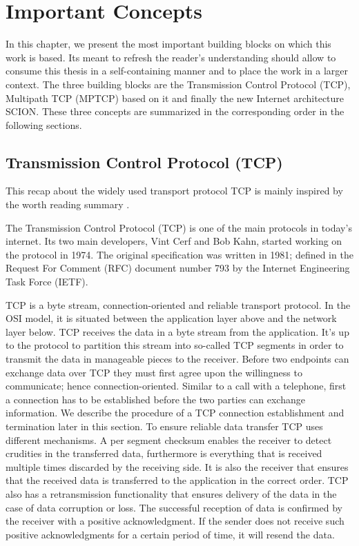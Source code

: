 
\chapter{Important Concepts}
\label{chap:Concepts}
In this chapter, we present the most important building blocks on which this work is based. Its meant to refresh the reader's understanding should allow to consume this thesis in a self-containing manner and to place the work in a larger context. The three building blocks are the Transmission Control Protocol (TCP), Multipath TCP (MPTCP) based on it and finally the new Internet architecture SCION. These three concepts are summarized in the corresponding order in the following sections.

\section{Transmission Control Protocol (TCP)}
\label{sec:TCP}

This recap about the widely used transport protocol TCP is mainly inspired by the worth reading summary \cite{TCPSummary}.

The Transmission Control Protocol (TCP) is one of the main protocols in today's internet. Its two main developers, Vint Cerf and Bob Kahn, started working on the protocol in 1974. The original specification was written in 1981; defined in the Request For Comment (RFC) document number 793 \cite{rfc793} by the Internet Engineering Task Force (IETF).

TCP is a byte stream, connection-oriented and reliable transport protocol. In the OSI model, it is situated between the application layer above and the network layer below. TCP receives the data in a byte stream from the application. It's up to the protocol to partition this stream into so-called TCP segments in order to transmit the data in manageable pieces to the receiver. Before two endpoints can exchange data over TCP they must first agree upon the willingness to communicate; hence connection-oriented. Similar to a call with a telephone, first a connection has to be established before the two parties can exchange information. We describe the procedure of a TCP connection establishment and termination later in this section. To ensure reliable data transfer TCP uses different mechanisms. A per segment checksum enables the receiver to detect crudities in the transferred data, furthermore is everything that is received multiple times discarded by the receiving side. It is also the receiver that ensures that the received data is transferred to the application in the correct order. TCP also has a retransmission functionality that ensures delivery of the data in the case of data corruption or loss. The successful reception of data is confirmed by the receiver with a positive acknowledgment. If the sender does not receive such positive acknowledgments for a certain period of time, it will resend the data. 

